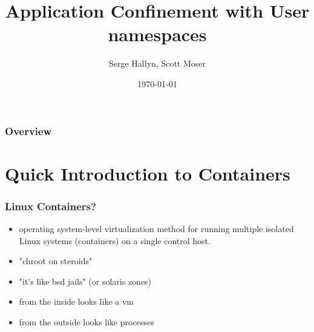 \documentclass{beamer}
\title[User Namespaces]{Application Confinement with User namespaces} %
\author{Serge Hallyn, Scott Moser} %
\institute[Canonical] %
{
Canonical, Inc \\ %
\medskip
\textit{serge.hallyn@ubuntu.com, scott.moser@canonical.com} %
}
\date{\today} %
\begin{document}
\begin{frame}
\titlepage %
\end{frame}

\begin{frame}
\frametitle{Overview} %
\tableofcontents %
\end{frame}


\section{Quick Introduction to Containers}
\begin{frame}
   \frametitle{Linux Containers?}
   \begin{itemize}
      \item operating system-level virtualization method for running multiple isolated Linux systems (containers) on a single control host.
      \item "chroot on steroids"
      \item "it's like bsd jails" (or solaris zones)
      \item from the inside looks like a vm
      \item from the outside looks like processes
    \end{itemize}
\end{frame}

\end{document}
